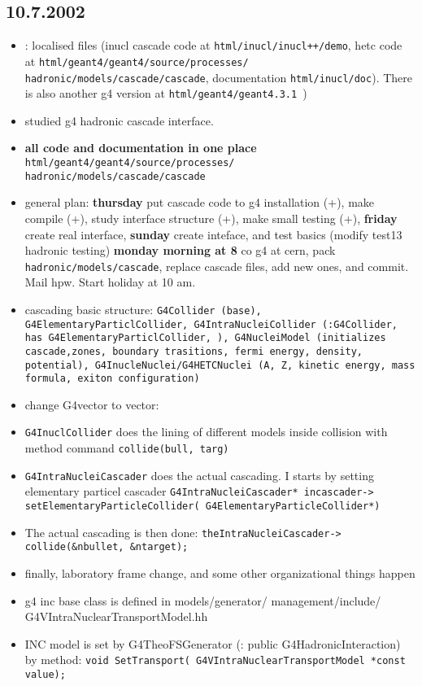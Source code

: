 \begin{appendix}
\subsection{10.7.2002}
\begin{itemize}
\item {\bf}: localised files (inucl cascade code at {\tt html/inucl/inucl++/demo}, 
hetc code at {\tt html/geant4/geant4/source/processes/ hadronic/models/cascade/cascade},  
documentation {\tt  html/inucl/doc}). 
There is also another g4 version at {\tt html/geant4/geant4.3.1 })
\item studied g4 hadronic cascade interface.
\item {\bf all code and documentation in one place} {\tt html/geant4/geant4/source/processes/ hadronic/models/cascade/cascade}
\item general plan: {\bf thursday} put cascade code to g4 installation (+), make compile (+), study interface structure (+), make small testing (+), 
{\bf friday} create real interface,
{\bf sunday} create inteface, and test basics (modify test13  hadronic testing)
{\bf monday morning at 8} co g4 at cern, pack {\tt hadronic/models/cascade}, replace cascade files, add new ones, and commit. Mail hpw. Start holiday at 10 am.
\item cascading basic structure: {\tt G4Collider (base),
G4ElementaryParticlCollider,
G4IntraNucleiCollider (:G4Collider, has G4ElementaryParticlCollider, ),
G4NucleiModel (initializes cascade,zones, boundary trasitions, fermi energy, density, potential),
G4InucleNuclei/G4HETCNuclei (A, Z, kinetic energy, mass formula, exiton configuration)      }
\item change G4vector to vector:
\item {\tt G4InuclCollider} does the lining of different models inside collision with method command {\tt collide(bull, targ)}
\item {\tt G4IntraNucleiCascader} does the actual cascading. I starts by setting elementary particel cascader {\tt G4IntraNucleiCascader* incascader-> setElementaryParticleCollider( G4ElementaryParticleCollider*)} 
\item The actual cascading is then done: {\tt theIntraNucleiCascader-> collide(\&nbullet, \&ntarget);}
\item finally, laboratory frame change, and some other organizational things happen 
\item g4 inc base class is defined in models/generator/ management/include/ G4VIntraNuclearTransportModel.hh
\item  INC model is set by G4TheoFSGenerator (: public G4HadronicInteraction) by method: {\tt void SetTransport( G4VIntraNuclearTransportModel *const  value);}


\end{itemize}
\end{appendix}
